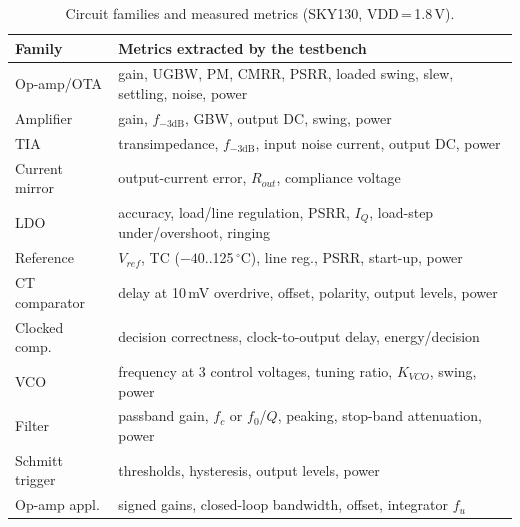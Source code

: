 \begin{table}[t]
\centering
\caption{Circuit families and measured metrics (SKY130, VDD\,=\,1.8\,V).}
\label{tab:families}
\scriptsize
\setlength{\tabcolsep}{3pt}
\begin{tabular}{@{}p{17mm}p{63mm}@{}}
\toprule
Family & Metrics extracted by the testbench \\
\midrule
Op-amp/OTA & gain, UGBW, PM, CMRR, PSRR, loaded swing, slew, settling, noise, power \\
Amplifier & gain, $f_{-3\mathrm{dB}}$, GBW, output DC, swing, power \\
TIA & transimpedance, $f_{-3\mathrm{dB}}$, input noise current, output DC, power \\
Current mirror & output-current error, $R_{out}$, compliance voltage \\
LDO & accuracy, load/line regulation, PSRR, $I_Q$, load-step under/overshoot, ringing \\
Reference & $V_{ref}$, TC ($-40$..125\,$^\circ$C), line reg., PSRR, start-up, power \\
CT comparator & delay at 10\,mV overdrive, offset, polarity, output levels, power \\
Clocked comp. & decision correctness, clock-to-output delay, energy/decision \\
VCO & frequency at 3 control voltages, tuning ratio, $K_{VCO}$, swing, power \\
Filter & passband gain, $f_c$ or $f_0$/$Q$, peaking, stop-band attenuation, power \\
Schmitt trigger & thresholds, hysteresis, output levels, power \\
Op-amp appl. & signed gains, closed-loop bandwidth, offset, integrator $f_u$ \\
\bottomrule
\end{tabular}
\end{table}
